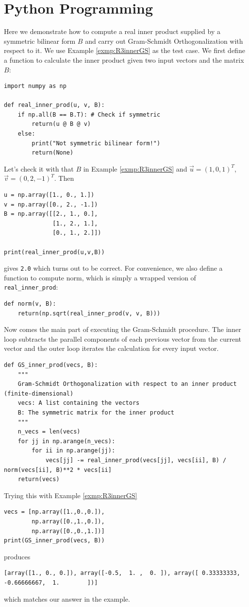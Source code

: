 \section{Python Programming}
Here we demonstrate how to compute a real inner product supplied by a symmetric bilinear form $B$ and carry out Gram-Schmidt Orthogonalization with respect to it. We use Example \ref{exmp:R3innerGS} as the test case. We first define a function to calculate the inner product given two input vectors and the matrix $B$:
\begin{lstlisting}
import numpy as np

def real_inner_prod(u, v, B):
    if np.all(B == B.T): # Check if symmetric
        return(u @ B @ v)
    else:
        print("Not symmetric bilinear form!")
        return(None)   
\end{lstlisting}
Let's check it with that $B$ in Example \ref{exmp:R3innerGS} and $\vec{u} = (1,0,1)^T$, $\vec{v} = (0,2,-1)^T$. Then
\begin{lstlisting}
u = np.array([1., 0., 1.])
v = np.array([0., 2., -1.])
B = np.array([[2., 1., 0.],  
              [1., 2., 1.],
              [0., 1., 2.]])

print(real_inner_prod(u,v,B))    
\end{lstlisting}
gives \verb|2.0| which turns out to be correct. For convenience, we also define a function to compute norm, which is simply a wrapped version of \verb|real_inner_prod|:
\begin{lstlisting}
def norm(v, B):
    return(np.sqrt(real_inner_prod(v, v, B)))
\end{lstlisting}
Now comes the main part of executing the Gram-Schmidt procedure. The inner loop subtracts the parallel components of each previous vector from the current vector and the outer loop iterates the calculation for every input vector.
\begin{lstlisting}
def GS_inner_prod(vecs, B):
    """
    Gram-Schmidt Orthogonalization with respect to an inner product (finite-dimensional)
    vecs: A list containing the vectors
    B: The symmetric matrix for the inner product
    """
    n_vecs = len(vecs)
    for jj in np.arange(n_vecs):
        for ii in np.arange(jj):
            vecs[jj] -= real_inner_prod(vecs[jj], vecs[ii], B) / norm(vecs[ii], B)**2 * vecs[ii]
    return(vecs)    
\end{lstlisting}
Trying this with Example \ref{exmp:R3innerGS}
\begin{lstlisting}
vecs = [np.array([1.,0.,0.]), 
        np.array([0.,1.,0.]), 
        np.array([0.,0.,1.])]
print(GS_inner_prod(vecs, B))
\end{lstlisting}
produces
\begin{lstlisting}
[array([1., 0., 0.]), array([-0.5,  1. ,  0. ]), array([ 0.33333333, -0.66666667,  1.        ])]    
\end{lstlisting}
which matches our answer in the example.

